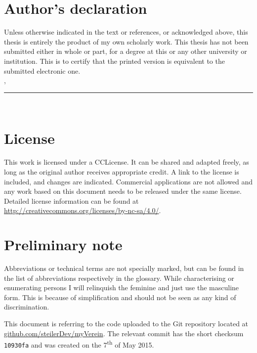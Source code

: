 \thispagestyle{empty}

\section*{Author's declaration}
\vspace*{1em}
Unless otherwise indicated in the text or references, or acknowledged above, this thesis is entirely the product of my own scholarly work. This thesis has not been submitted either in whole or part, for a degree at this or any other university or institution. This is to certify that the printed version is equivalent to the submitted electronic one.
\vspace{2em}\\
\abgabeort, \datumAbgabe
\vspace{3em}\\
\rule{6cm}{0.4pt}\\
\autor
\vspace*{1.5em}

\section*{License}

\vspace*{1.5em}
This work is licensed under a \acrfull{CCLicense}. It can be shared and adapted freely, as long as the original author receives appropriate credit. A link to the license is included, and changes are indicated. Commercial applications are not allowed and any work based on this document needs to be released under the same license. Detailed license information can be found at \url{http://creativecommons.org/licenses/by-nc-sa/4.0/}.
\vspace{1.5em}

\section*{Preliminary note}

\vspace*{1.5em}
Abbreviations or technical terms are not specially marked, but can be found in the list of abbreviations respectively in the glossary. While characterising or enumerating persons I will relinquish the feminine and just use the masculine form. This is because of simplification and should not be seen as any kind of discrimination. 

This document is referring to the code uploaded to the Git repository located at \url{github.com/steilerDev/myVerein}. The relevant commit has the short checksum \texttt{10930fa} and was created on the 7\textsuperscript{th} of May 2015.
